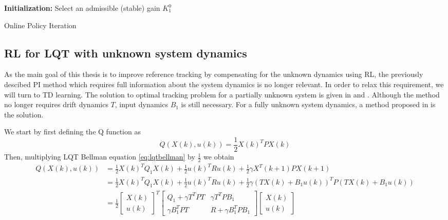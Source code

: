 \begin{algorithm}[H]
	\textbf{Initialization:} Select an admissible (stable) gain $K^0_1$\\
	\label{alg:on_pi}
	\caption{Online Policy Iteration}
\end{algorithm}

\subsection{\ac{RL} for \ac{LQT} with unknown system dynamics}
As the main goal of this thesis is to improve reference tracking by compensating for the unknown dynamics using \ac {RL}, the previously descibed \ac {PI} method which requires full information about the system dynamics is no longer relevant. In order to relax this requirement, we will turn to \ac {TD} learning. The solution to optimal tracking problem for a partially unknown system is given in \cite{Kiumarsi6760476} \cite{Kiumarsi6918527} and \cite{Modares20141780}. Although the method no longer requires drift dynamics $T$, input dynamics $B_1$ is still necessary. For a fully unknown system dynamics, a method proposed in \cite{Kiumarsi20141167} is the solution. 

We start by first defining the Q function as 
\begin{equation}
Q(X(k), u(k)) = \frac{1}{2}X(k)^TPX(k) 
\end{equation}
Then, multiplying \ac{LQT} Bellman equation \eqref{eq:lqtbellman} by $ \frac{1}{2} $ we obtain
\begin{equation}
\begin{split}
Q(X(k), u(k)) &= \frac{1}{2}X(k)^TQ_1X(k) + \frac{1}{2}u(k)^TRu(k) + \frac{1}{2}\gamma X^T(k+1)PX(k+1) \\
&= \frac{1}{2}X(k)^TQ_1X(k) + \frac{1}{2}u(k)^TRu(k) + \frac{1}{2}\gamma (TX(k) + B_1u(k))^TP(TX(k) + B_1u(k)) \\
&= \frac{1}{2}\left[  \begin{array}{c}
X(k) \\ 
u(k)
\end{array} \right] ^T \left[\begin{array}{cc}
Q_1+\gamma T^TPT & \gamma T^TPB_1 \\ 
\gamma B_1^TPT & R+\gamma B_1^TPB_1
\end{array}  \right] 
\left[  \begin{array}{c}
X(k) \\ 
u(k)
\end{array} \right] 
\end{split}
\label{eq:bellman_Q}
\end{equation}

